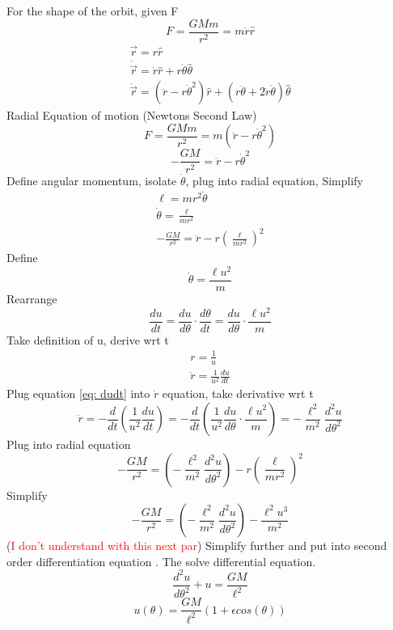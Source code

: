 \documentclass[12pt]{article}
\begin{document}
    For the shape of the orbit, given F
    \[
        F = \frac{G M m}{r^2} = m \ddot{r} \hat{r}
    \]
    \begin{gather*}
        \vec{r} = r \hat{r}
        \\ \dot{\vec{r}} = \dot{r} \hat{r} + r \dot{\theta} \hat{\theta}
        \\ \ddot{\vec{r}} = (\ddot{r} - r \dot{\theta}^2) \hat{r} + (r \ddot{\theta} + 2 \dot{r} \dot{\theta}) \hat{\theta}
    \end{gather*}
    Radial Equation of motion (Newtons Second Law)
    \[
        F = \frac{G M m}{r^2} = m (\ddot{r} - r \dot{\theta}^2) 
    \]
    \[
        - \frac{G M}{r^2} = \ddot{r} - r \dot{\theta}^2
    \]
    Define angular momentum, isolate $\dot{\theta}$, plug into radial equation, Simplify
    \begin{gather*}
        \ell = m r^2 \dot{\theta}
        \\ \dot{\theta} = \frac{\ell}{m r^2}
        \\ - \frac{G M}{r^2} = \ddot{r} - r \left(\frac{\ell}{m r^2} \right)^2  
    \end{gather*}
    Define 
    \[
        \dot{\theta} = \frac{\ell u^2}{m}
    \]
    Rearrange
    \begin{equation} \label{eq: dudt}
        \frac{du}{dt} = \frac{du}{d\theta} \cdot \frac{d\theta}{dt} = \frac{du}{d\theta} \cdot \frac{\ell u^2}{m}
    \end{equation}
    Take definition of u, derive wrt t 
    \begin{gather*}
        r = \frac{1}{u}
        \\ \dot{r} = \frac{1}{u^2} \frac{du}{dt}
    \end{gather*}
    Plug equation \ref{eq: dudt} into $\dot{r}$ equation, take derivative wrt t
    \[
        \ddot{r} = -\frac{d}{dt} \left( \frac{1}{u^2} \frac{du}{dt} \right) = -\frac{d}{dt} \left( \frac{1}{u^2} \frac{du}{d\theta} \cdot \frac{\ell u^2}{m} \right) = -\frac{\ell^2}{m^2} \frac{d^2 u}{d\theta^2}
    \]
    Plug into radial equation
    \[
        - \frac{G M}{r^2} = \left(-\frac{\ell^2}{m^2} \frac{d^2 u}{d\theta^2} \right) - r \left(\frac{\ell}{m r^2} \right)^2
    \]
    Simplify
    \[
        - \frac{G M}{r^2} = \left(-\frac{\ell^2}{m^2} \frac{d^2 u}{d\theta^2} \right) - \frac{\ell^2 u^3}{m^2}
    \]
    (\textcolor{red}{I don't understand with this next par}) Simplify further and put into second order differentiation equation . The solve differential equation. 
    \[
        \frac{d^2 u}{d\theta^2} + u = \frac{G M}{\ell^2}
    \]
    \[
        u(\theta) = \frac{G M}{\ell^2} (1 + \epsilon cos(\theta))
    \]
\end{document}
